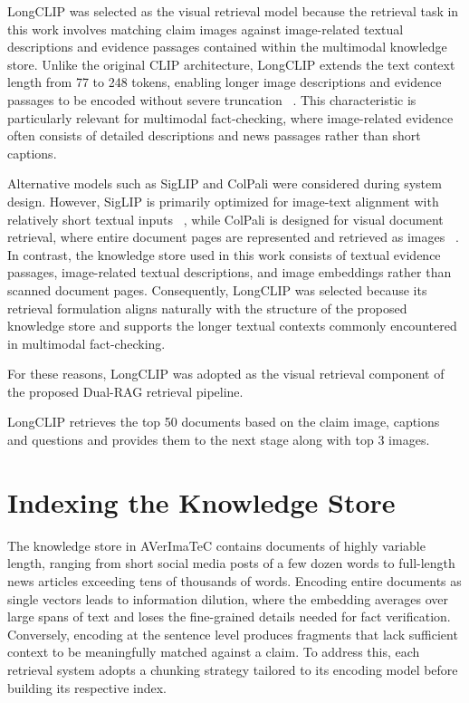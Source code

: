 LongCLIP was selected as the visual retrieval model because the retrieval task in this work involves matching claim images against image-related textual descriptions and evidence passages contained within the multimodal knowledge store. Unlike the original CLIP architecture, LongCLIP extends the text context length from 77 to 248 tokens, enabling longer image descriptions and evidence passages to be encoded without severe truncation ~\cite{Zhang2024Mar}. This characteristic is particularly relevant for multimodal fact-checking, where image-related evidence often consists of detailed descriptions and news passages rather than short captions.

Alternative models such as SigLIP and ColPali were considered during system design. However, SigLIP is primarily optimized for image-text alignment with relatively short textual inputs ~\cite{Zhai2023Mar}, while ColPali is designed for visual document retrieval, where entire document pages are represented and retrieved as images ~\cite{Faysse2024Jun}. In contrast, the knowledge store used in this work consists of textual evidence passages, image-related textual descriptions, and image embeddings rather than scanned document pages. Consequently, LongCLIP was selected because its retrieval formulation aligns naturally with the structure of the proposed knowledge store and supports the longer textual contexts commonly encountered in multimodal fact-checking.

For these reasons, LongCLIP was adopted as the visual retrieval component of the proposed Dual-RAG retrieval pipeline.

LongCLIP retrieves the top 50 documents based on the claim image, captions and questions and provides them to the next stage along with top 3 images.


\section{Indexing the Knowledge Store}

The knowledge store in AVerImaTeC contains documents of highly variable length, ranging from short social media posts of a few dozen words to full-length news articles exceeding tens of thousands of words. Encoding entire documents as single vectors leads to information dilution, where the embedding averages over large spans of text and loses the fine-grained details needed for fact verification. Conversely, encoding at the sentence level produces fragments that lack sufficient context to be meaningfully matched against a claim. To address this, each retrieval system adopts a chunking strategy tailored to its encoding model before building its respective index.

